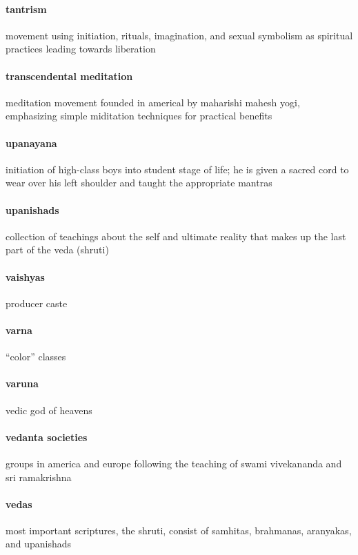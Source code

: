\documentclass{article}
\begin{document}
\paragraph{tantrism}
\label{par:tantrism}
movement using initiation, rituals, imagination, and sexual symbolism as spiritual practices leading towards liberation
\paragraph{transcendental meditation}
\label{par:transcendental_meditation}
meditation movement founded in americal by maharishi mahesh yogi, emphasizing simple miditation techniques for practical benefits
\paragraph{upanayana}
\label{par:upanayana}
initiation of high-class boys into student stage of life; he is given a sacred cord to wear over his left shoulder and taught the appropriate mantras
\paragraph{upanishads}
\label{par:upanishads}
collection of teachings about the self and ultimate reality that makes up the last part of the veda (shruti)
\paragraph{vaishyas}
\label{par:vaishyas}
producer caste
\paragraph{varna}
\label{par:varna}
``color'' classes
\paragraph{varuna}
\label{par:varuna}
vedic god of heavens
\paragraph{vedanta societies}
\label{par:vedanta_societies}
groups in america and europe following the teaching of swami vivekananda and sri ramakrishna
\paragraph{vedas}
\label{par:vedas}
most important scriptures, the shruti, consist of samhitas, brahmanas, aranyakas, and upanishads
\end{document}
